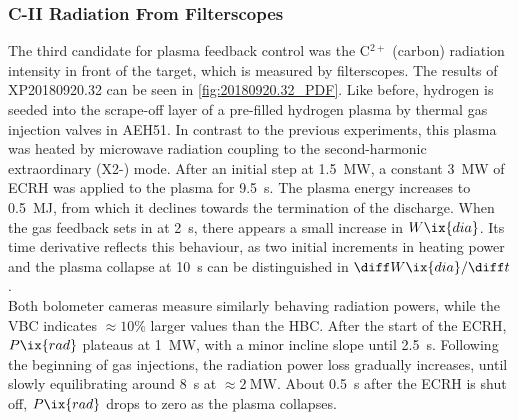             \subsubsection*{C-II Radiation From Filterscopes}
%
                The third candidate for plasma feedback control was the C$^{2+}$ (carbon) radiation intensity in front of the target, which is measured by filterscopes. The results of XP20180920.32 can be seen in \cref{fig:20180920.32_PDF}. Like before, hydrogen is seeded into the scrape-off layer of a pre-filled hydrogen plasma by thermal gas injection valves in AEH51. In contrast to the previous experiments, this plasma was heated by microwave radiation coupling to the second-harmonic extraordinary (X2-) mode. After an initial step at \SI{1.5}{\mega\watt}, a constant \SI{3}{\mega\watt} of ECRH was applied to the plasma for \SI{9.5}{\second}. The plasma energy increases to \SI{0.5}{\mega\joule}, from which it declines towards the termination of the discharge. When the gas feedback sets in at \SI{2}{\second}, there appears a small increase in $W\ix{dia}$. Its time derivative reflects this behaviour, as two initial increments in heating power and the plasma collapse at \SI{10}{\second} can be distinguished in $\diff W\ix{dia}/\diff t$.\\%
                Both bolometer cameras measure similarly behaving radiation powers, while the VBC indicates $\approx10\%$ larger values than the HBC. After the start of the ECRH, $P\ix{rad}$ plateaus at \SI{1}{\mega\watt}, with a minor incline slope until \SI{2.5}{\second}. Following the beginning of gas injections, the radiation power loss gradually increases, until slowly equilibrating around \SI{8}{\second} at $\approx\SI{2}{\mega\watt}$. About \SI{0.5}{\second} after the ECRH is shut off, $P\ix{rad}$ drops to zero as the plasma collapses.\\%
%
